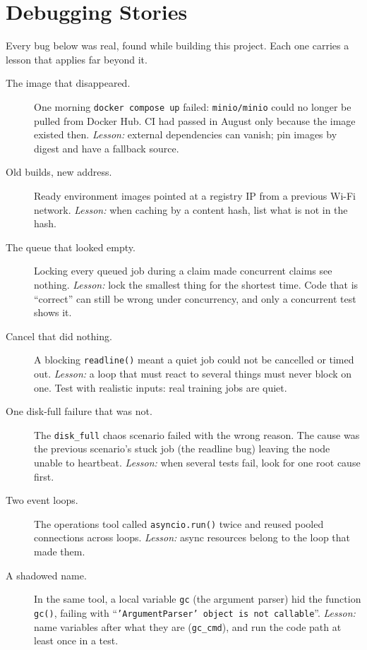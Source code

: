 \section{Debugging Stories}

Every bug below was real, found while building this project. Each one carries
a lesson that applies far beyond it.

\begin{description}
\item[The image that disappeared.] One morning \texttt{docker compose up} failed:
  \texttt{minio/minio} could no longer be pulled from Docker Hub. CI had passed
  in August only because the image existed then.
  \emph{Lesson:} external dependencies can vanish; pin images by digest and
  have a fallback source.

\item[Old builds, new address.] Ready environment images pointed at a registry
  IP from a previous Wi-Fi network.
  \emph{Lesson:} when caching by a content hash, list what is not in the hash.

\item[The queue that looked empty.] Locking every queued job during a claim made
  concurrent claims see nothing.
  \emph{Lesson:} lock the smallest thing for the shortest time. Code that is
  ``correct'' can still be wrong under concurrency, and only a concurrent test
  shows it.

\item[Cancel that did nothing.] A blocking \texttt{readline()} meant a quiet job
  could not be cancelled or timed out.
  \emph{Lesson:} a loop that must react to several things must never block on
  one. Test with realistic inputs: real training jobs are quiet.

\item[One disk-full failure that was not.] The \texttt{disk\_full} chaos
  scenario failed with the wrong reason. The cause was the previous scenario's
  stuck job (the readline bug) leaving the node unable to heartbeat.
  \emph{Lesson:} when several tests fail, look for one root cause first.

\item[Two event loops.] The operations tool called \texttt{asyncio.run()} twice
  and reused pooled connections across loops.
  \emph{Lesson:} async resources belong to the loop that made them.

\item[A shadowed name.] In the same tool, a local variable \texttt{gc} (the
  argument parser) hid the function \texttt{gc()}, failing with
  ``\texttt{'ArgumentParser' object is not callable}''.
  \emph{Lesson:} name variables after what they are (\texttt{gc\_cmd}), and run
  the code path at least once in a test.


\end{description}

